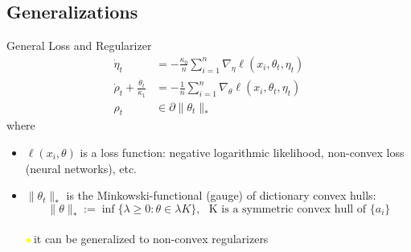 \documentclass[slidestop,compress,9pt,epsfig,color]{beamer}
\theoremstyle{example}
\providecommand{\subitem}{\\ \textcolor{yellow}{$\bullet\ $}}
\begin{document}
\subsection{Generalizations}
\begin{frame}{General Loss and Regularizer}
\begin{subequations}\label{eq:bregman-iss}
\begin{align}
 \dot\eta_t & = -  \frac{\kappa_0}{n} \sum_{i=1}^n \nabla_{\eta} \ell (x_i,\theta_t, \eta_t)  \label{eq:bregman-issc}\\
 \dot\rho_t + \frac{\dot \theta_t}{\kappa_1} &=-\frac{1}{n} \sum_{i=1}^n \nabla_{\theta} \ell (x_i,\theta_t, \eta_t) \label{eq:bregman-issa}\\
 \rho_t &\in \partial\|\theta_t\|_* \label{eq:bregman-issb}
\end{align}
\end{subequations}
where
\begin{itemize}
\item $\ell(x_i,\theta)$ is a loss function: negative logarithmic likelihood, non-convex loss (neural networks), etc.
\item $\|\theta_t\|_*$ is the Minkowski-functional (gauge) of dictionary convex hulls: $$ \|\theta\|_* := \inf\{\lambda \geq 0: \theta\in \lambda K\}, \ \ \ \mbox{K is a symmetric convex hull of $\{a_i\}$}$$
\subitem it can be generalized to non-convex regularizers
\end{itemize}
\end{frame}
\end{document}
